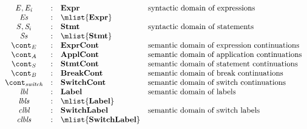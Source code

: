 \documentclass[a4paper,oneside,fleqn]{article}
\newcommand{\dexpr}{\mathbf{Expr}}
\newcommand{\dstmt}{\mathbf{Stmt}}
\newcommand{\decont}{\mathbf{ExprCont}}
\newcommand{\dscont}{\mathbf{StmtCont}}
\newcommand{\dacont}{\mathbf{ApplCont}}
\newcommand{\dbcont}{\mathbf{BreakCont}}
\newcommand{\dswitchcont}{\mathbf{SwitchCont}}
\newcommand{\dlbl}{\mathbf{Label}}
\newcommand{\dclbl}{\mathbf{SwitchLabel}}
\begin{document}
\[
  \begin{array}{ccll}
    \expr, \expri{i}
    & : & \dexpr & \text{syntactic domain of expressions}\\
    \exprs
    & : & \mlist{\dexpr}\\

    \stmt, \stmti{i}
    & : & \dstmt & \text{syntactic domain of statements}\\
    \stmts
    & : & \mlist{\dstmt}  & \text{}\\

    \econt
    & : & \decont & \text{semantic domain of expression continuations}\\
    \acont
    & : & \dacont & \text{semantic domain of application continuations}\\
    \scont
    & : & \dscont & \text{semantic domain of statement continuations}\\
    \bcont
    & : & \dbcont & \text{semantic domain of break continuations}\\
    \switchcont
    & : & \dswitchcont & \text{semantic domain of switch continuations}\\

    \lbl & : & \dlbl & \text{semantic domain of labels}\\
    \lbls & : & \mlist{\dlbl} \\
    \clbl & : & \dclbl & \text{semantic domain of switch labels}\\
    \clbls & : & \mlist{\dclbl} \\


\end{array}\]
\end{document}
